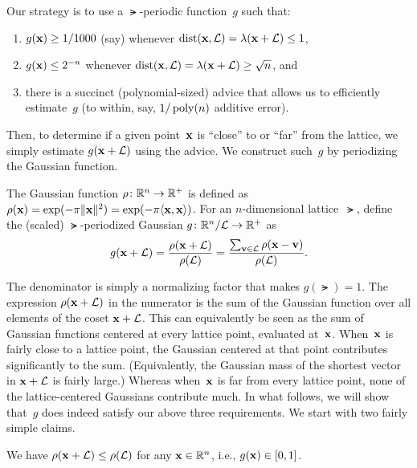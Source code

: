\documentclass[11pt]{article}
\begin{document}
Our strategy is to use a $\lat$-periodic function~$g$ such that:
\begin{enumerate}
\item $g(\mathbf{x}) \geq 1/1000$ (say) whenever
  $\operatorname{dist}(\mathbf{x},\mathcal{L}) = \lambda(\mathbf{x}+\mathcal{L}) \leq 1$,
\item $g(\mathbf{x}) \leq 2^{-n}$ whenever
  $\operatorname{dist}(\mathbf{x},\mathcal{L}) = \lambda(\mathbf{x}+\mathcal{L}) \geq \sqrt{n}$, and
\item there is a succinct (polynomial-sized) advice that allows us to
  efficiently estimate~$g$ (to within, say, $1/\operatorname{poly}(n)$ additive
  error).
\end{enumerate}
Then, to determine if a given point~$\mathbf{x}$ is ``close'' to or ``far''
from the lattice, we simply estimate $g(\mathbf{x}+\mathcal{L})$ using the advice.
We construct such~$g$ by periodizing the Gaussian function.

\begin{definition}
  \label{def:gaussian}
  The Gaussian function $\rho \colon \mathbb{R}^{n} \to \mathbb{R}^{+}$ is defined as
  $\rho(\mathbf{x}) = \exp(-\pi \lVert\mathbf{x}\rVert^2) = \exp(-\pi
  \langle\mathbf{x},\mathbf{x}\rangle)$. For an $n$-dimensional lattice~$\lat$, define
  the (scaled) $\lat$-periodized Gaussian
  $g \colon \mathbb{R}^{n}/\mathcal{L} \to \mathbb{R}^{+}$ as
  \begin{equation}
    \label{eq:g}
    g(\mathbf{x} + \mathcal{L}) = \frac{\rho(\mathbf{x}+\mathcal{L})}{\rho(\mathcal{L})} =
    \frac{\sum_{\mathbf{v} \in \mathcal{L}} \rho(\mathbf{x} - \mathbf{v})}{\rho(\mathcal{L})}.
  \end{equation}
\end{definition}

The denominator is simply a normalizing factor that makes
$g(\lat) = 1$. The expression $\rho(\mathbf{x}+\mathcal{L})$ in the numerator is
the sum of the Gaussian function over all elements of the coset
$\mathbf{x}+\mathcal{L}$. This can equivalently be seen as the sum of Gaussian
functions centered at every lattice point, evaluated at~$\mathbf{x}$.
When~$\mathbf{x}$ is fairly close to a lattice point, the Gaussian centered
at that point contributes significantly to the sum. (Equivalently, the
Gaussian mass of the shortest vector in $\mathbf{x}+\mathcal{L}$ is fairly large.)
Whereas when~$\mathbf{x}$ is far from every lattice point, none of the
lattice-centered Gaussians contribute much. In what follows, we will
show that~$g$ does indeed satisfy our above three requirements. We
start with two fairly simple claims.

\begin{claim}
  We have $\rho(\mathbf{x} + \mathcal{L}) \leq \rho(\mathcal{L})$ for any $\mathbf{x} \in
  \mathbb{R}^n$, i.e., $g(\mathbf{x}) \in [0,1]$.
\end{claim}
\end{document}
